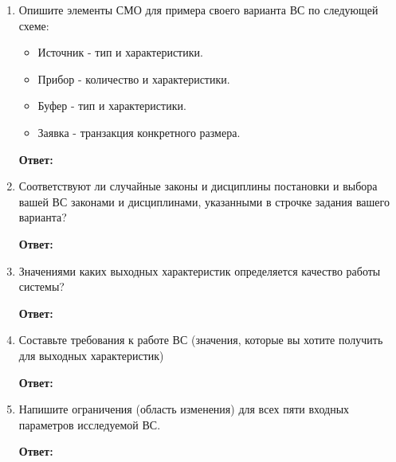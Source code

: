\documentclass[a4paper, 14pt]{article}
\begin{document}
\begin{enumerate}
	\item Опишите элементы СМО для примера своего варианта ВС по следующей схеме:
	      \begin{itemize}
		      \item Источник - тип и характеристики.
		      \item Прибор - количество и характеристики.
		      \item Буфер - тип и характеристики.
		      \item Заявка - транзакция конкретного размера.
	      \end{itemize}

	      \textbf{Ответ:}
	\item Соответствуют ли случайные законы и дисциплины постановки и выбора вашей ВС законами и дисциплинами, указанными в строчке задания вашего варианта?

	      \textbf{Ответ:}
	\item Значениями каких выходных характеристик определяется качество работы системы?

	      \textbf{Ответ:}
	\item Составьте требования к работе ВС (значения, которые вы хотите получить для выходных характеристик)

	      \textbf{Ответ:}
	\item Напишите ограничения (область изменения) для всех пяти входных параметров исследуемой ВС.

	      \textbf{Ответ:}
\end{enumerate}
\end{document}
